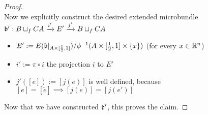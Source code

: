 \begin{proof}
    \\ Now we explicitly construct the desired extended microbundle $\bundledef{\bb'}{B \sqcup_f CA}{E'}{i'}{j'}$
    \begin{itemize}
        \item $E' := E(\bb\restrict{A \times [\frac{1}{2}, 1]}) / \phi^{-1}(A \times [\frac{1}{2}, 1] \times \{x\})$ (for every $x \in \R^n$)
        \item $i' := \pi \circ i$ the projection $i$ to $E'$
        \item $j'([e]) := [j(e)]$ is well defined, because $[e] = [\tilde{e}] \implies [j(e)] = [j(e')]$
    \end{itemize}
    Now that we have constructed $\bb'$, this proves the claim.
\end{proof}